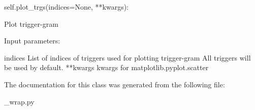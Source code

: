 \begin{DoxyVerb}self.plot_trgs(indices=None, **kwargs):

Plot trigger-gram

Input parameters:

    indices     List of indices of triggers used for plotting trigger-gram
    All triggers will be used by default.
    **kwargs    kwargs for matplotlib.pyplot.scatter
\end{DoxyVerb}
 

The documentation for this class was generated from the following file\-:\begin{DoxyCompactItemize}
\item 
\-\_\-wrap.\-py\end{DoxyCompactItemize}
